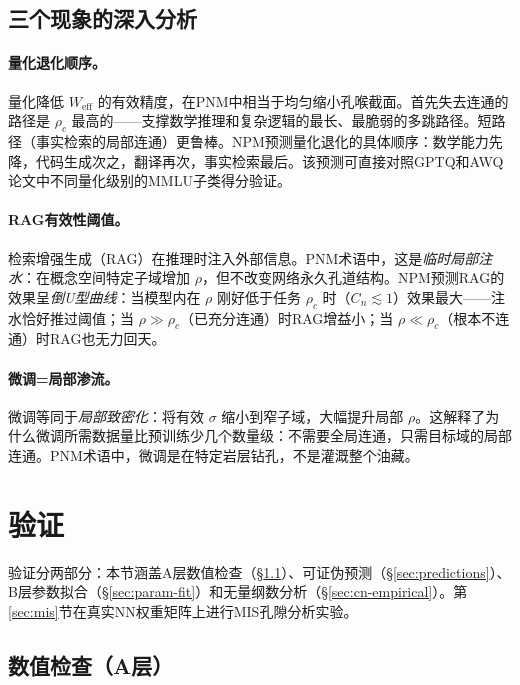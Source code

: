 \documentclass[11pt,a4paper]{article}
\newcommand{\Weff}{W_{\text{eff}}}
\newcommand{\rhoc}{\rho_c}
\begin{document}
\subsection{三个现象的深入分析}

\paragraph{量化退化顺序。}
量化降低 $\Weff$ 的有效精度，在PNM中相当于均匀缩小孔喉截面。首先失去连通的路径是 $\rhoc$ 最高的——支撑数学推理和复杂逻辑的最长、最脆弱的多跳路径。短路径（事实检索的局部连通）更鲁棒。NPM预测量化退化的具体顺序：数学能力先降，代码生成次之，翻译再次，事实检索最后。该预测可直接对照GPTQ和AWQ论文中不同量化级别的MMLU子类得分验证。

\paragraph{RAG有效性阈值。}
检索增强生成（RAG）在推理时注入外部信息。PNM术语中，这是\emph{临时局部注水}：在概念空间特定子域增加 $\rho$，但不改变网络永久孔道结构。NPM预测RAG的效果呈\emph{倒U型曲线}：当模型内在 $\rho$ 刚好低于任务 $\rhoc$ 时（$C_n\lesssim1$）效果最大——注水恰好推过阈值；当 $\rho\gg\rhoc$（已充分连通）时RAG增益小；当 $\rho\ll\rhoc$（根本不连通）时RAG也无力回天。

\paragraph{微调=局部渗流。}
微调等同于\emph{局部致密化}：将有效 $\sigma$ 缩小到窄子域，大幅提升局部 $\rho$。这解释了为什么微调所需数据量比预训练少几个数量级：不需要全局连通，只需目标域的局部连通。PNM术语中，微调是在特定岩层钻孔，不是灌溉整个油藏。

\section{验证}

验证分两部分：本节涵盖A层数值检查（\S\ref{sec:a-checks}）、可证伪预测（\S\ref{sec:predictions}）、B层参数拟合（\S\ref{sec:param-fit}）和无量纲数分析（\S\ref{sec:cn-empirical}）。第\ref{sec:mis}节在真实NN权重矩阵上进行MIS孔隙分析实验。

\subsection{数值检查（A层）}
\label{sec:a-checks}
\end{document}

